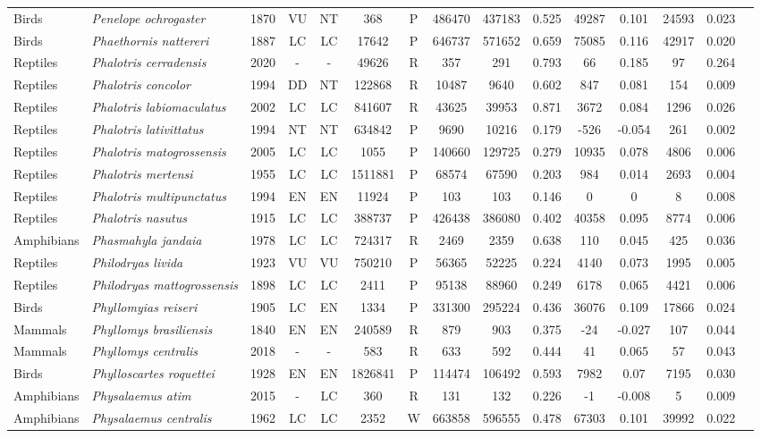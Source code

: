 \documentclass[12pt,openright,oneside,a4paper,english]{abntex2}
\begin{document}
\begin{landscape}
\begin{longtable}{llccccccccccccc}
		Birds&\textit{Penelope ochrogaster}&1870&VU&NT&368&P&486470&437183&0.525&49287&0.101&24593&0.023\\
		Birds&\textit{Phaethornis nattereri}&1887&LC&LC&17642&P&646737&571652&0.659&75085&0.116&42917&0.020\\
		Reptiles&\textit{Phalotris cerradensis}&2020&-&-&49626&R&357&291&0.793&66&0.185&97&0.264\\
		Reptiles&\textit{Phalotris concolor}&1994&DD&NT&122868&R&10487&9640&0.602&847&0.081&154&0.009\\
		Reptiles&\textit{Phalotris labiomaculatus}&2002&LC&LC&841607&R&43625&39953&0.871&3672&0.084&1296&0.026\\
		Reptiles&\textit{Phalotris lativittatus}&1994&NT&NT&634842&P&9690&10216&0.179&-526&-0.054&261&0.002\\
		Reptiles&\textit{Phalotris matogrossensis}&2005&LC&LC&1055&P&140660&129725&0.279&10935&0.078&4806&0.006\\
		Reptiles&\textit{Phalotris mertensi}&1955&LC&LC&1511881&P&68574&67590&0.203&984&0.014&2693&0.004\\
		Reptiles&\textit{Phalotris multipunctatus}&1994&EN&EN&11924&P&103&103&0.146&0&0&8&0.008\\
		Reptiles&\textit{Phalotris nasutus}&1915&LC&LC&388737&P&426438&386080&0.402&40358&0.095&8774&0.006\\
		Amphibians&\textit{Phasmahyla jandaia}&1978&LC&LC&724317&R&2469&2359&0.638&110&0.045&425&0.036\\
		Reptiles&\textit{Philodryas livida}&1923&VU&VU&750210&P&56365&52225&0.224&4140&0.073&1995&0.005\\
		Reptiles&\textit{Philodryas mattogrossensis}&1898&LC&LC&2411&P&95138&88960&0.249&6178&0.065&4421&0.006\\
		Birds&\textit{Phyllomyias reiseri}&1905&LC&EN&1334&P&331300&295224&0.436&36076&0.109&17866&0.024\\
		Mammals&\textit{Phyllomys brasiliensis}&1840&EN&EN&240589&R&879&903&0.375&-24&-0.027&107&0.044\\
		Mammals&\textit{Phyllomys centralis}&2018&-&-&583&R&633&592&0.444&41&0.065&57&0.043\\
		Birds&\textit{Phylloscartes roquettei}&1928&EN&EN&1826841&P&114474&106492&0.593&7982&0.07&7195&0.030\\
		Amphibians&\textit{Physalaemus atim}&2015&-&LC&360&R&131&132&0.226&-1&-0.008&5&0.009\\
		Amphibians&\textit{Physalaemus centralis}&1962&LC&LC&2352&W&663858&596555&0.478&67303&0.101&39992&0.022\\

\end{longtable}
\end{landscape}
\end{document}
